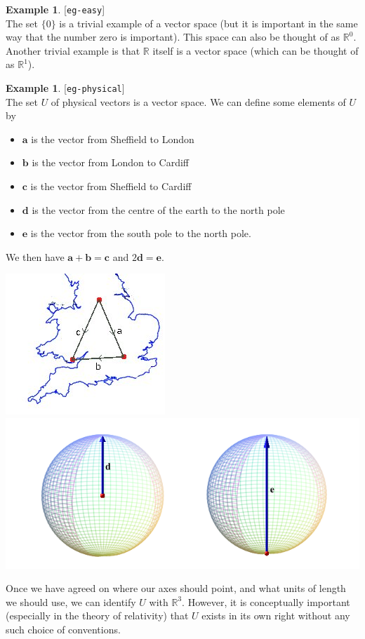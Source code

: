 \documentclass{amsart}
\newcommand{\lbl}[1]{\label{#1}\textup{[\texttt{#1}]}\ \\}
\newcommand{\lbl}{\label}
\newcommand{\R}         {{\mathbb{R}}}
\newcommand{\va}        {\mathbf{a}}
\newcommand{\vb}        {\mathbf{b}}
\newcommand{\vc}        {\mathbf{c}}
\newcommand{\vd}        {\mathbf{d}}
\newcommand{\ve}        {\mathbf{e}}
\renewcommand{\:}       {\colon}
\theoremstyle{definition}
\newtheorem{example}[theorem]{Example}
\begin{document}
\begin{example}\lbl{eg-easy}
 The set $\{0\}$ is a trivial example of a vector space (but
 it is important in the same way that the number zero is
 important).  This space can also be thought of as $\R^0$.
 Another trivial example is that $\R$ itself is a vector
 space (which can be thought of as $\R^1$).
\end{example}

\begin{example}\lbl{eg-physical}
 The set $U$ of physical vectors is a vector space.  We can
 define some elements of $U$ by
 \begin{itemize}
  \item $\va$ is the vector from Sheffield to London
  \item $\vb$ is the vector from London to Cardiff
  \item $\vc$ is the vector from Sheffield to Cardiff
  \item $\vd$ is the vector from the centre of the earth to the north
    pole
  \item $\ve$ is the vector from the south pole to the north pole.
 \end{itemize}
 We then have $\va+\vb=\vc$ and $2\vd=\ve$.
 \begin{center}
  \includegraphics[scale=0.5]{uk}
  \includegraphics[scale=0.4]{globes}
 \end{center}
 Once we have agreed on where our axes should point, and
 what units of length we should use, we can identify $U$
 with $\R^3$.  However, it is conceptually important
 (especially in the theory of relativity) that $U$ exists in
 its own right without any such choice of conventions.
\end{example}
\end{document}
